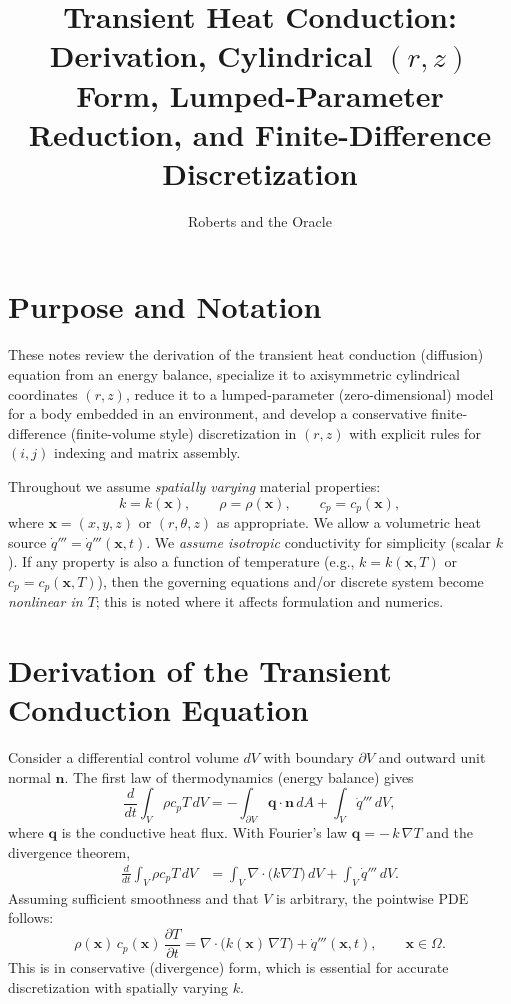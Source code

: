 \documentclass[11pt]{article}
\title{Transient Heat Conduction: Derivation, Cylindrical $(r,z)$ Form, Lumped-Parameter Reduction, and Finite-Difference Discretization}
\author{Roberts and the Oracle}
\date{}
\begin{document}
\maketitle

\section{Purpose and Notation}

These notes review the derivation of the transient heat conduction (diffusion) equation from an energy balance, specialize it to axisymmetric cylindrical coordinates $(r,z)$, reduce it to a lumped-parameter (zero-dimensional) model for a body embedded in an environment, and develop a conservative finite-difference (finite-volume style) discretization in $(r,z)$ with explicit rules for $(i,j)$ indexing and matrix assembly.

Throughout we assume \emph{spatially varying} material properties:
\[
k=k(\mathbf{x}),\qquad \rho=\rho(\mathbf{x}),\qquad c_p=c_p(\mathbf{x}),
\]
where $\mathbf{x}=(x,y,z)$ or $(r,\theta,z)$ as appropriate. We allow a volumetric heat source $\dot{q}'''=\dot{q}'''(\mathbf{x},t)$. We \emph{assume isotropic} conductivity for simplicity (scalar $k$). If any property is also a function of temperature (e.g., $k=k(\mathbf{x},T)$ or $c_p=c_p(\mathbf{x},T)$), then the governing equations and/or discrete system become \emph{nonlinear in $T$}; this is noted where it affects formulation and numerics.

\section{Derivation of the Transient Conduction Equation}

Consider a differential control volume $dV$ with boundary $\partial V$ and outward unit normal $\mathbf{n}$. The first law of thermodynamics (energy balance) gives
\begin{equation}
\frac{d}{dt} \int_V \rho c_p T\, dV
= - \int_{\partial V} \mathbf{q}\cdot\mathbf{n}\, dA + \int_V \dot{q}''' \, dV ,
\label{eq:balance}
\end{equation}
where $\mathbf{q}$ is the conductive heat flux. With Fourier's law $\mathbf{q}=-\,k\,\nabla T$ and the divergence theorem,
\begin{align}
\frac{d}{dt} \int_V \rho c_p T\, dV
&= \int_V \nabla\cdot\big(k\nabla T\big)\, dV + \int_V \dot{q}''' \, dV .
\end{align}
Assuming sufficient smoothness and that $V$ is arbitrary, the pointwise PDE follows:
\begin{equation}
\rho(\mathbf{x})\,c_p(\mathbf{x})\,\frac{\partial T}{\partial t}
= \nabla\cdot\!\big(k(\mathbf{x})\,\nabla T\big) + \dot{q}'''(\mathbf{x},t),
\qquad \mathbf{x}\in\Omega.
\label{eq:generalPDE}
\end{equation}
This is in conservative (divergence) form, which is essential for accurate discretization with spatially varying $k$.
\end{document}
